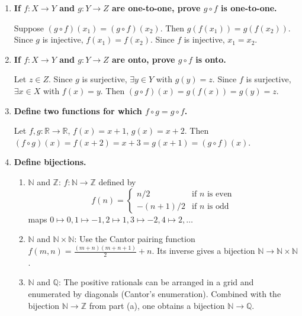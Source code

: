 \documentclass[11pt]{book}
\def\NN{\mathbb{N}}
\def\RN{\mathbb{R}}
\def\ZN{\mathbb{Z}}
\def\QN{\mathbb{Q}}
\begin{document}
\begin{enumerate}[{0.}1. ]
\begin{enumerate}
\item $\sim(\sim R)= R$ for a relation $R$ (where $\sim R$ is the converse): $\sim R = \{\langle y,x\rangle \mid \langle x,y\rangle \in R\}$. Then $\sim(\sim R) = \{\langle x,y\rangle \mid \langle y,x\rangle \in \sim R\} = \{\langle x,y\rangle \mid \langle x,y\rangle \in R\} = R$.
\end{enumerate}

\item \textbf{If $f: X\to Y$ and $g: Y\to Z$ are one-to-one, prove $g\circ f$ is one-to-one.}

Suppose $(g\circ f)(x_1) = (g\circ f)(x_2)$. Then $g(f(x_1))=g(f(x_2))$. Since $g$ is injective, $f(x_1)=f(x_2)$. Since $f$ is injective, $x_1=x_2$.

\item \textbf{If $f: X\to Y$ and $g: Y\to Z$ are onto, prove $g\circ f$ is onto.}

Let $z \in Z$. Since $g$ is surjective, $\exists y \in Y$ with $g(y)=z$. Since $f$ is surjective, $\exists x \in X$ with $f(x)=y$. Then $(g\circ f)(x)=g(f(x))=g(y)=z$.

\item \textbf{Define two functions for which $f\circ g = g\circ f$.}

Let $f,g: \RN \to \RN$, $f(x) = x+1$, $g(x) = x+2$. Then $(f\circ g)(x) = f(x+2)=x+3 = g(x+1) = (g\circ f)(x)$.

\item \textbf{Define bijections.}

\begin{enumerate}
\item $\NN$ and $\ZN$: $f: \NN \to \ZN$ defined by
\[ f(n) = \begin{cases} n/2 & \text{if } n \text{ is even}\\ -(n+1)/2 & \text{if } n \text{ is odd}\end{cases} \]
maps $0\mapsto 0, 1\mapsto -1, 2\mapsto 1, 3\mapsto -2, 4\mapsto 2,\ldots$

\item $\NN$ and $\NN\times\NN$: Use the Cantor pairing function $f(m,n) = \frac{(m+n)(m+n+1)}{2}+n$. Its inverse gives a bijection $\NN \to \NN\times\NN$.

\item $\NN$ and $\QN$: The positive rationals can be arranged in a grid and enumerated by diagonals (Cantor's enumeration). Combined with the bijection $\NN \to \ZN$ from part (a), one obtains a bijection $\NN \to \QN$.


\end{enumerate}
\end{enumerate}
\end{document}

